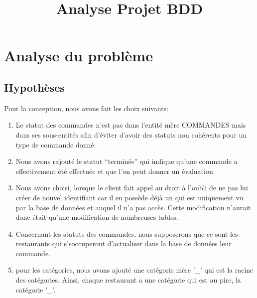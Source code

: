 \documentclass[10pt, a4paper]{article}
\title{Analyse Projet BDD}
\date{}
\begin{document}
\maketitle
\tableofcontents
\newpage

\section{Analyse du problème}
\subsection{Hypothèses}
Pour la conception, nous avons fait les choix suivants:
\begin{enumerate}
    \item Le statut des commandes n'est pas dans l'entité mère COMMANDES 
mais dans ses sous-entités afin d'éviter d'avoir des statuts non cohérents 
pour un type de commande donné.
    \item Nous avons rajouté le statut ``terminée'' qui indique qu'une 
commande a effectivement été effectuée et que l'on peut donner un 
évaluation
    \item Nous avons choisi, lorsque le client fait appel au droit à l'oubli de ne pas lui créer de nouvel identifiant car il en possède déjà
    un qui est uniquement vu par la base de données et auquel il n'a pas accès. Cette modification n'aurait donc était qu'une modification de nombreuses tables.
    \item Concernant les statuts des commandes, nous supposerons que ce sont les restaurants qui s'soccuperont d'actualiser dans la base de données leur commande.
    \item pour les catégories, nous avons ajouté une catégorie mère '\_' qui est la racine des catégories.
    Ainsi, chaque restaurant a une catégorie qui est au pire, la catégorie '\_'.
\end{enumerate}
\end{document}

